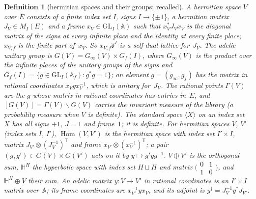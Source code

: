 \documentclass[11pt,a4paper]{article}
\newcommand{\Hom}{\operatorname{Hom}}
\newcommand{\kw}[1]{\emph{#1}}
\newcommand{\m}[1]{\mbox{$#1$}}        %
\theoremstyle{plainx}
\theoremstyle{uprightx}
\newtheorem{definition}[theorem]{Definition}
\newcommand{\A}{\mathbb{A}}
\newcommand{\Af}{\mathbb{A}_f}
\newcommand{\Oh}{\hat{\mathfrak{o}}}
\newcommand{\Hm}[2]{\Hom(#1,#2)}
\newcommand{\St}[1]{\langle #1\rangle}          %
\newcommand{\Hyp}[2]{\mathbb{H}^{#1}\oplus #2}  %
\newcommand{\Gg}[1]{G(#1)}
\newcommand{\Gfin}[1]{G_f(#1)}
\newcommand{\qG}[1]{[G(#1)]}
\begin{document}
\begin{definition}[hermitian spaces and their groups; recalled]\label{d:spaces}
A \kw{hermitian space} $V$ over $E$ consists of a finite index set $I$, \kw{signs} \m{I\to\{\pm1\}}, a hermitian
matrix \m{J_V\in M_I(E)} and a \kw{frame} \m{x_V\in\mathrm{GL}_I(\A)} such that \m{x_V^{*}J_Vx_V} is the diagonal
matrix of the signs at every infinite place and the identity at every finite place; $x_{V,f}$ is the finite part
of~$x_V$. So $x_{V,f}\Oh^{I}$ is a self-dual lattice for~$J_V$. The adelic unitary group is
\m{\Gg{V}=G_\infty(V)\times\Gfin{I}}, where $G_\infty(V)$ is the product over the infinite places of the unitary
groups of the signs and \m{\Gfin{I}=\{g\in\mathrm{GL}_I(\Af):g^{*}g=1\}}; an element \m{g=(g_\infty,g_f)} has the
\kw{matrix in rational coordinates} \m{x_Vgx_V^{-1}}, which is unitary for~$J_V$. The \kw{rational points}
$\Gamma(V)$ are the $g$ whose matrix in rational coordinates has entries in~$E$, and \m{\qG{V}=\Gamma(V)\backslash\Gg{V}}
carries the invariant measure of the library (a probability measure when $V$ is definite). The \kw{standard space}
$\St{X}$ on an index set $X$ has all signs $+1$, \m{J=1} and frame~$1$; it is definite. For hermitian spaces $V$,
$V'$ (index sets $I$, $I'$), \m{\Hm{V}{V'}} is the hermitian space with index set \m{I'\times I}, matrix
\m{J_{V'}\otimes(J_V^{-1})^{\mathsf T}} and frame \m{x_{V'}\otimes(x_V^{-1})^{\mathsf T}}; a pair
\m{(g,g')\in\Gg{V}\times\Gg{V'}} acts on it by \m{y\mapsto g'yg^{-1}}. \m{V\oplus V'} is the orthogonal sum,
$\mathbb{H}^{H}$ the hyperbolic space with index set \m{H\sqcup H} and matrix
$\bigl(\begin{smallmatrix}0&1\\1&0\end{smallmatrix}\bigr)$, and \m{\Hyp{H}{V}} their sum. An adelic matrix
\m{y\colon V\to V'} \kw{in rational coordinates} is an \m{I'\times I} matrix over~$\A$; its \kw{frame coordinates}
are \m{x_{V'}^{-1}yx_V}, and its \kw{adjoint} is \m{y^{\dagger}=J_V^{-1}y^{*}J_{V'}}.
\end{definition}
\end{document}
